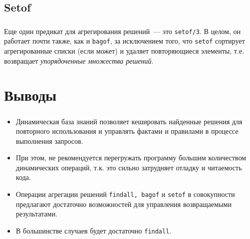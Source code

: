 \subsection{Setof}


\begin{frame}

	\frametitle{\insertsection}
	\framesubtitle{\insertsubsection}
	
	Еще один предикат для агрегирования решений~--- это \texttt{setof/3}. В целом, он работает почти также, как и \texttt{bagof}, за исключением того, что
	\texttt{setof} сортирует агрегированные списки (если может) и удаляет повторяющиеся элементы, т.е. возвращает \textit{упорядоченные множества решений}.

\end{frame}





\section{Выводы}

\begin{frame}

	\frametitle{\insertsection}
	
	\begin{itemize}
		\item Динамическая база знаний позволяет кешировать найденные решения для повторного использования и управлять фактами и правилами в процессе выполнения запросов.
		\item При этом, не рекомендуется перегружать программу большим количеством динамических операций, т.к. это сильно затрудняет отладку и читаемость кода.
		\item Операции агрегации решений \texttt{findall, bagof} и \texttt{setof} в совокупности предлагают достаточно возможностей для управления возвращаемыми результатами.
		\item В большинстве случаев будет достаточно \texttt{findall}.
	\end{itemize}

\end{frame}
